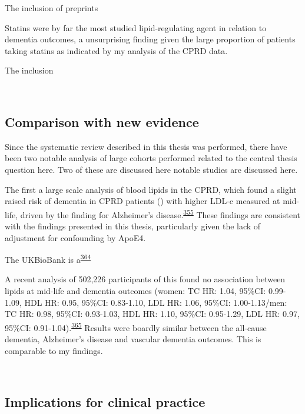 \documentclass[a4paper, twoside]{templates/ociamthesis}
\begin{document}
The inclusion of preprints

Statins were by far the most studied lipid-regulating agent in relation to dementia outcomes, a unsurprising finding given the large proportion of patients taking statins as indicated by my analysis of the CPRD data.

The inclusion

~

\newpage

\hypertarget{comparison-with-new-evidence}{%
\subsection{Comparison with new evidence}\label{comparison-with-new-evidence}}

Since the systematic review described in this thesis was performed, there have been two notable analysis of large cohorts performed related to the central thesis question here. Two of these are discussed here notable studies are discussed here.

The first a large scale analysis of blood lipids in the CPRD, which found a slight raised risk of dementia in CPRD patients () with higher LDL-c measured at mid-life, driven by the finding for Alzheimer's disease.\textsuperscript{\protect\hyperlink{ref-iwagami2021}{355}} These findings are consistent with the findings presented in this thesis, particularly given the lack of adjustment for confounding by ApoE4.

The UKBioBank is a\textsuperscript{\protect\hyperlink{ref-sudlow2015}{364}}

A recent analysis of 502,226 participants of this found no association between lipids at mid-life and dementia outcomes (women: TC HR: 1.04, 95\%CI: 0.99-1.09, HDL HR: 0.95, 95\%CI: 0.83-1.10, LDL HR: 1.06, 95\%CI: 1.00-1.13/men: TC HR: 0.98, 95\%CI: 0.93-1.03, HDL HR: 1.10, 95\%CI: 0.95-1.29, LDL HR: 0.97, 95\%CI: 0.91-1.04).\textsuperscript{\protect\hyperlink{ref-gong2021}{365}} Results were boardly similar between the all-cause dementia, Alzheimer's disease and vascular dementia outcomes. This is comparable to my findings.

~\\
\newpage

\hypertarget{implications-for-clinical-practice}{%
\subsection{Implications for clinical practice}\label{implications-for-clinical-practice}}
\end{document}
